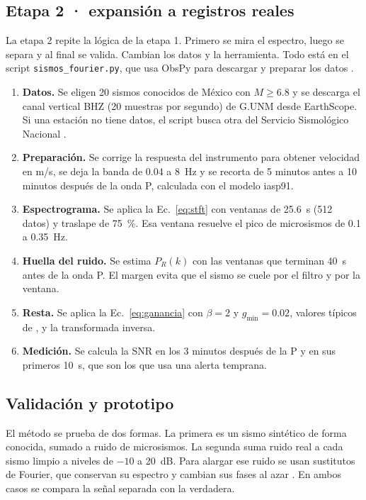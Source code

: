 \documentclass[11pt,letterpaper]{article}
\begin{document}
\subsection{Etapa 2 · expansión a registros reales}
La etapa 2 repite la lógica de la etapa 1. Primero se mira el espectro, luego se separa y al final se valida. Cambian los datos y la herramienta. Todo está en el script \texttt{sismos\_fourier.py}, que usa ObsPy para descargar y preparar los datos \parencite{obspy2010}.
\begin{enumerate}
\item \textbf{Datos.} Se eligen 20 sismos conocidos de México con $M \geq 6.8$ y se descarga el canal vertical BHZ (20 muestras por segundo) de G.UNM desde EarthScope. Si una estación no tiene datos, el script busca otra del Servicio Sismológico Nacional \parencite{ssn}.
\item \textbf{Preparación.} Se corrige la respuesta del instrumento para obtener velocidad en \si{m/s}, se deja la banda de 0.04 a \SI{8}{Hz} y se recorta de 5 minutos antes a 10 minutos después de la onda P, calculada con el modelo iasp91.
\item \textbf{Espectrograma.} Se aplica la Ec.~\eqref{eq:stft} con ventanas de \SI{25.6}{s} (512 datos) y traslape de \SI{75}{\percent}. Esa ventana resuelve el pico de microsismos de 0.1 a \SI{0.35}{Hz}.
\item \textbf{Huella del ruido.} Se estima $P_R(k)$ con las ventanas que terminan \SI{40}{s} antes de la onda P. El margen evita que el sismo se cuele por el filtro y por la ventana.
\item \textbf{Resta.} Se aplica la Ec.~\eqref{eq:ganancia} con $\beta = 2$ y $g_{\min} = 0.02$, valores típicos de \textcite{berouti1979}, y la transformada inversa.
\item \textbf{Medición.} Se calcula la SNR en los 3 minutos después de la P y en sus primeros \SI{10}{s}, que son los que usa una alerta temprana.
\end{enumerate}

\subsection{Validación y prototipo}
El método se prueba de dos formas. La primera es un sismo sintético de forma conocida, sumado a ruido de microsismos. La segunda suma ruido real a cada sismo limpio a niveles de $-10$ a \SI{20}{dB}. Para alargar ese ruido se usan sustitutos de Fourier, que conservan su espectro y cambian sus fases al azar \parencite{theiler1992}. En ambos casos se compara la señal separada con la verdadera.
\end{document}
